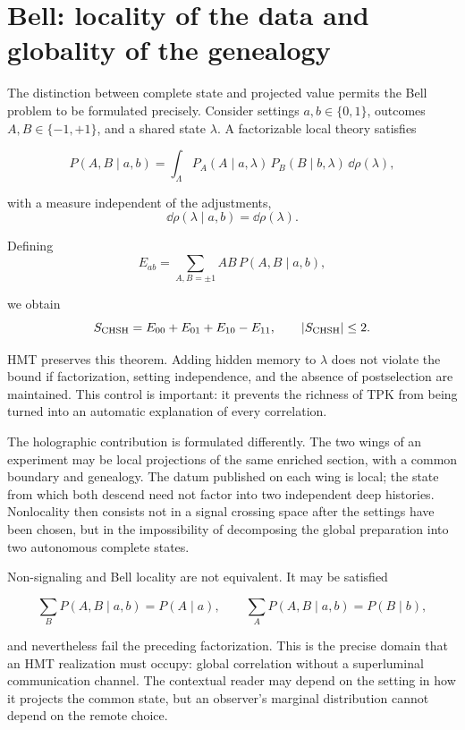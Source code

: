 \section{Bell: locality of the data and globality of the genealogy}

The distinction between complete state and projected value permits the Bell
problem to be formulated precisely. Consider settings \(a,b\in\{0,1\}\), outcomes
\(A,B\in\{-1,+1\}\), and a shared state \(\lambda\). A factorizable
local theory satisfies

\[
  P(A,B\mid a,b)
  =
  \int_\Lambda
  P_A(A\mid a,\lambda)\,
  P_B(B\mid b,\lambda)\,
  \dd\rho(\lambda),
\]

with a measure independent of the adjustments,
\[
  \dd\rho(\lambda\mid a,b)=\dd\rho(\lambda).
\]

Defining
\[
  E_{ab}
  =
  \sum_{A,B=\pm1}AB\,P(A,B\mid a,b),
\]

we obtain
\[
  S_{\rm CHSH}=E_{00}+E_{01}+E_{10}-E_{11},
  \qquad |S_{\rm CHSH}|\leq2.
\]

HMT preserves this theorem. Adding hidden memory to \(\lambda\) does not violate the bound if
factorization, setting independence, and the absence of
postselection are maintained. This control is important: it prevents the richness of TPK from being turned into
an automatic explanation of every correlation.

The holographic contribution is formulated differently. The two wings of an experiment may be local projections of the same enriched section, with a common boundary and genealogy. The datum published on each wing is local; the state from which both descend need not factor into two independent deep histories. Nonlocality then consists not in a signal crossing space after the settings have been chosen, but in the impossibility of decomposing the global preparation into two autonomous complete states.

Non-signaling and Bell locality are not equivalent. It may be satisfied

\[
  \sum_B P(A,B\mid a,b)=P(A\mid a),
  \qquad
  \sum_A P(A,B\mid a,b)=P(B\mid b),
\]

and nevertheless fail the preceding factorization. This is the precise domain that an HMT realization must occupy: global correlation without a superluminal communication channel. The contextual reader may depend on the setting in how it projects the common state, but an observer's marginal distribution cannot depend on the remote choice.

